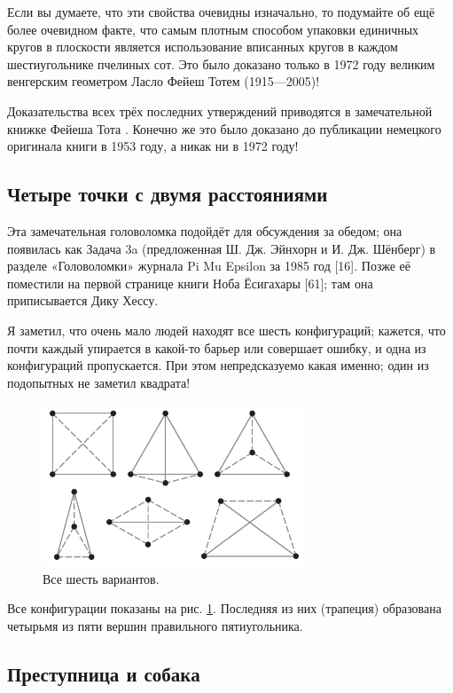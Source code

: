 Если вы думаете, что эти свойства очевидны изначально, то подумайте об ещё более очевидном факте, что самым плотным способом упаковки единичных кругов в плоскости является использование вписанных кругов в каждом шестиугольнике пчелиных сот.
Это было доказано только в 1972 году великим венгерским геометром Ласло Фейеш Тотем (1915---2005)!

\begin{addedbytheeditors}
Доказательства всех трёх последних утверждений приводятся в замечательной книжке Фейеша Тота \cite[III §3]{tot}.
Конечно же это было доказано до публикации немецкого оригинала книги в 1953 году, а никак ни в 1972 году!
\end{addedbytheeditors}

\subsection*{Четыре точки с двумя расстояниями}

Эта замечательная головоломка подойдёт для обсуждения за обедом;
она появилась как Задача 3a (предложенная Ш. Дж. Эйнхорн и И. Дж. Шёнберг) в разделе «Головоломки» журнала Pi Mu Epsilon за 1985 год [16].
Позже её поместили на первой странице книги Ноба Ёсигахары [61];
там она приписывается Дику Хессу.

Я заметил, что очень мало людей находят все шесть конфигураций;
кажется, что почти каждый упирается в какой-то барьер или совершает ошибку, и одна из конфигураций пропускается.
При этом непредсказуемо какая именно; один из подопытных не заметил квадрата!

\begin{figure}[h!]
\centering
\includegraphics[scale=1]{pics/2dist}
\caption{Все шесть вариантов.}
\label{pic:2dist}
\end{figure}

Все конфигурации показаны на рис. \ref{pic:2dist}.
Последняя из них (трапеция) образована четырьмя из пяти вершин правильного пятиугольника.


\subsection*{Преступница и собака}

